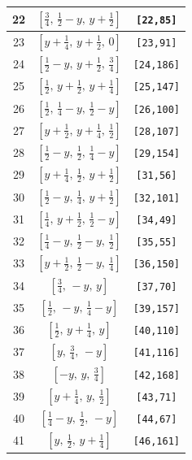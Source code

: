 \documentclass[fleqn,8pt]{jsarticle}
\begin{document}
\begin{longtable}{ccc}
22 & $\left[ \frac{3}{4},\, \frac{1}{2} - y,\, y + \frac{1}{2} \right]$ & {\tt [22,85]} \\ \hline
23 & $\left[ y + \frac{1}{4},\, y + \frac{1}{2},\, 0 \right]$ & {\tt [23,91]} \\ \hline
24 & $\left[ \frac{1}{2} - y,\, y + \frac{1}{2},\, \frac{3}{4} \right]$ & {\tt [24,186]} \\ \hline
25 & $\left[ \frac{1}{2},\, y + \frac{1}{2},\, y + \frac{1}{4} \right]$ & {\tt [25,147]} \\ \hline
26 & $\left[ \frac{1}{2},\, \frac{1}{4} - y,\, \frac{1}{2} - y \right]$ & {\tt [26,100]} \\ \hline
27 & $\left[ y + \frac{1}{2},\, y + \frac{1}{4},\, \frac{1}{2} \right]$ & {\tt [28,107]} \\ \hline
28 & $\left[ \frac{1}{2} - y,\, \frac{1}{2},\, \frac{1}{4} - y \right]$ & {\tt [29,154]} \\ \hline
29 & $\left[ y + \frac{1}{4},\, \frac{1}{2},\, y + \frac{1}{2} \right]$ & {\tt [31,56]} \\ \hline
30 & $\left[ \frac{1}{2} - y,\, \frac{1}{4},\, y + \frac{1}{2} \right]$ & {\tt [32,101]} \\ \hline
31 & $\left[ \frac{1}{4},\, y + \frac{1}{2},\, \frac{1}{2} - y \right]$ & {\tt [34,49]} \\ \hline
32 & $\left[ \frac{1}{4} - y,\, \frac{1}{2} - y,\, \frac{1}{2} \right]$ & {\tt [35,55]} \\ \hline
33 & $\left[ y + \frac{1}{2},\, \frac{1}{2} - y,\, \frac{1}{4} \right]$ & {\tt [36,150]} \\ \hline
34 & $\left[ \frac{3}{4},\, - y,\, y \right]$ & {\tt [37,70]} \\ \hline
35 & $\left[ \frac{1}{2},\, - y,\, \frac{1}{4} - y \right]$ & {\tt [39,157]} \\ \hline
36 & $\left[ \frac{1}{2},\, y + \frac{1}{4},\, y \right]$ & {\tt [40,110]} \\ \hline
37 & $\left[ y,\, \frac{3}{4},\, - y \right]$ & {\tt [41,116]} \\ \hline
38 & $\left[ - y,\, y,\, \frac{3}{4} \right]$ & {\tt [42,168]} \\ \hline
39 & $\left[ y + \frac{1}{4},\, y,\, \frac{1}{2} \right]$ & {\tt [43,71]} \\ \hline
40 & $\left[ \frac{1}{4} - y,\, \frac{1}{2},\, - y \right]$ & {\tt [44,67]} \\ \hline
41 & $\left[ y,\, \frac{1}{2},\, y + \frac{1}{4} \right]$ & {\tt [46,161]} \\ \hline

\end{longtable}
\end{document}
